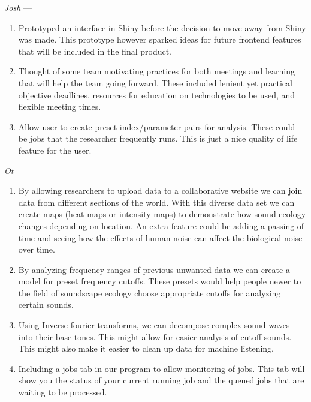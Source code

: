 \textit{Josh} ---
\begin{enumerate}
    \item Prototyped an interface in Shiny before the decision to move away from Shiny was made. This prototype however sparked ideas for future frontend features that will be included in the final product.
    \item Thought of some team motivating practices for both meetings and learning that will help the team going forward. These included lenient yet practical objective deadlines, resources for education on technologies to be used, and flexible meeting times.
    \item Allow user to create preset index/parameter pairs for analysis. These could be jobs that the researcher frequently runs. This is just a nice quality of life feature for the user.
\end{enumerate}

\textit{Ot} ---
\begin{enumerate}
    \item By allowing researchers to upload data to a collaborative website we can join data from different sections of the world. With this diverse data set we can create maps (heat maps or intensity maps) to demonstrate how sound ecology changes depending on location. An extra feature could be adding a passing of time and seeing how the effects of human noise can affect the biological noise over time.
    \item By analyzing frequency ranges of previous unwanted data we can create a model for preset frequency cutoffs. These presets would help people newer to the field of soundscape ecology choose appropriate cutoffs for analyzing certain sounds.
    \item Using Inverse fourier transforms, we can decompose complex sound waves into their base tones. This might allow for easier analysis of cutoff sounds. This might also make it easier to clean up data for machine listening.
    \item Including a jobs tab in our program to allow monitoring of jobs. This tab will show you the status of your current running job and the queued jobs that are waiting to be processed.
\end{enumerate}
